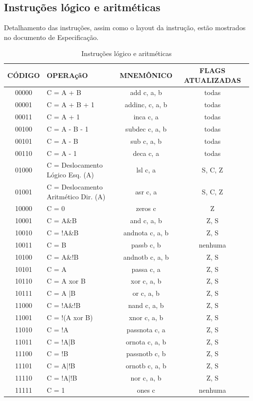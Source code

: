 \documentclass{article}
\begin{document}
\subsection{Instruções lógico e aritméticas}
    Detalhamento das instruções, assim como o layout da instrução, estão mostrados no documento de Especificação.
	\begin{table}[H]
	\centering
	\begin{tabular}{|c|m{6cm}|c|c|}
  	\hline 
  	\textbf{CÓDIGO} & \textbf{OPERAçãO} & \textbf{MNEMÔNICO} & \textbf{FLAGS ATUALIZADAS} \\ 
  	\hline   	
  	00000 & C = A + B & add c, a, b & todas \\ \hline
  	00001 & C = A + B + 1 & addinc, c, a, b & todas \\ \hline
  	00011 & C = A + 1 & inca c, a & todas \\ \hline
  	00100 & C = A - B - 1 & subdec c, a, b & todas \\ \hline
  	00101 & C = A - B & sub c, a, b & todas \\ \hline
  	00110  & C = A - 1 & deca c, a & todas \\ \hline
  	01000 & C = Deslocamento Lógico Esq. (A) & lsl c, a & S, C, Z \\ \hline
  	01001 & C = Deslocamento Aritmético Dir. (A) & asr c, a & S, C, Z \\ \hline
  	10000 & C = 0 & zeros c & Z \\ \hline
    10001 & C = A\&B & and c, a, b & Z, S \\ \hline
    10010 & C = !A\&B & andnota c, a, b & Z, S \\ \hline
    10011 & C = B & passb c, b & nenhuma \\ \hline
    10100 & C = A\&!B & andnotb c, a, b & Z, S \\ \hline
    10101 & C = A & passa c, a & Z, S \\ \hline
    10110 & C = A xor B & xor c, a, b & Z, S \\ \hline
    10111 & C = A |B & or c, a, b & Z, S \\ \hline
    11000 & C = !A\&!B & nand c, a, b & Z, S \\ \hline
    11001 & C = !(A xor B) & xnor c, a, b & Z, S \\ \hline
    11010 & C = !A & passnota c, a & Z, S \\ \hline
    11011 & C = !A|B & ornota c, a, b & Z, S \\ \hline
    11100 & C = !B & passnotb c, b & Z, S \\ \hline
    11101 & C = A|!B & ornotb c, a, b & Z, S \\ \hline
    11110 & C = !A|!B & nor c, a, b & Z, S \\ \hline
    11111 & C = 1 & ones c & nenhuma \\ \hline
  	\end{tabular} 
  	\caption{Instruções lógico e aritméticas}
  \end{table}
  \newpage    
\end{document}
